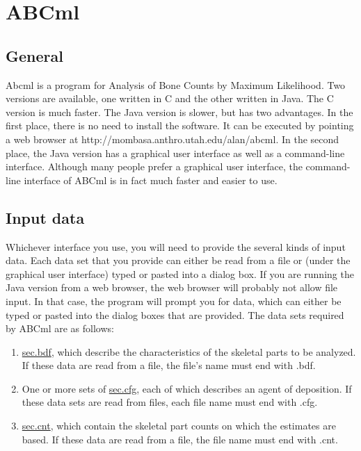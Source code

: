 
\chapter{ABCml\label{ch.abcml}}%

\section{General}

Abcml is a program for Analysis of Bone Counts by Maximum Likelihood.  Two
versions are available, one written in C and the other written in Java.  The C
version is much faster.  The Java version is slower, but has two advantages.
In the first place, there is no need to install the software.  It can be
executed by pointing a web browser at
%
{http://mombasa.anthro.utah.edu/alan/abcml}.  In the second place, the Java
version has a graphical user interface as well as a command-line interface.
Although many people prefer a graphical user interface, the command-line
interface of ABCml is in fact much faster and easier to use.

\section{Input data}

Whichever interface you use, you will need to provide the several kinds of
input data.  Each data set that you provide can either be read from a file or
(under the graphical user interface) typed or pasted into a dialog box.  If
you are running the Java version from a web browser, the web browser will
probably not allow file input.  In that case, the program will prompt you for
data, which can either be typed or pasted into the dialog boxes that are
provided.  The data sets required by ABCml are as follows:
\begin{enumerate}
\item \hyperref{Bone definition data}{Bone definition data (See
    section~}{)}{sec.bdf}, which describe the characteristics of the skeletal
  parts to be analyzed.  If these data are read from a file, the file's name 
  must end with .bdf.
  
\item One or more sets of \hyperref{agent definition data}{agent definition
    data (See section~}{)}{sec.cfg}, each of which describes an agent of
  deposition.  If these data sets are read from files, each file name must end
  with .cfg.
  
\item \hyperref{Skeletal part count data}{Skeletal part count data (See
    section~}{)}{sec.cnt}, which contain the skeletal part counts on which the
  estimates are based.  If these data are read from a file, the file name must
  end with .cnt.
\end{enumerate}


